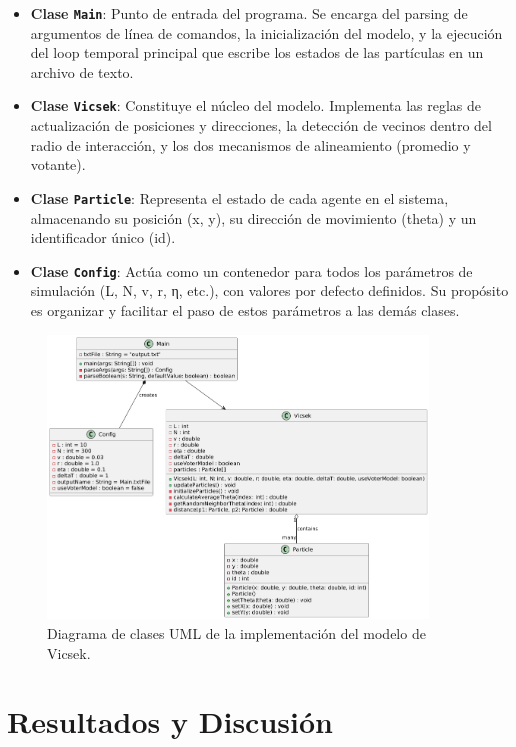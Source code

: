 \documentclass{article}
\begin{document}
\begin{itemize}
\item \textbf{Clase \texttt{Main}}: Punto de entrada del programa. Se encarga del parsing de argumentos de línea de comandos, la inicialización del modelo, y la ejecución del loop temporal principal que escribe los estados de las partículas en un archivo de texto.
\item \textbf{Clase \texttt{Vicsek}}: Constituye el núcleo del modelo. Implementa las reglas de actualización de posiciones y direcciones, la detección de vecinos dentro del radio de interacción, y los dos mecanismos de alineamiento (promedio y votante).
\item \textbf{Clase \texttt{Particle}}: Representa el estado de cada agente en el sistema, almacenando su posición (x, y), su dirección de movimiento (theta) y un identificador único (id).
\item \textbf{Clase \texttt{Config}}: Actúa como un contenedor para todos los parámetros de simulación (L, N, v, r, η, etc.), con valores por defecto definidos. Su propósito es organizar y facilitar el paso de estos parámetros a las demás clases.
\end{itemize}

\begin{figure}[H]
\centering
\includegraphics[width=0.9\textwidth]{TP2_UML.png}
\caption{Diagrama de clases UML de la implementación del modelo de Vicsek.}
\label{fig:uml}
\end{figure}

\section{Resultados y Discusión}
\end{document}
